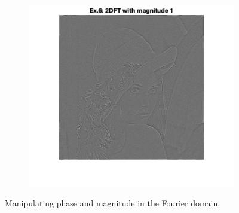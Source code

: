 \documentclass{article}
\begin{document}
\begin{enumerate}
\begin{figure}
\begin{subfigure}[b]{0.4\textwidth}
        \includegraphics[width=\textwidth]{images/lena_1_mag.png}
        \label{fig:fourier_1mag}
    \end{subfigure}
    \caption{Manipulating phase and magnitude in the Fourier domain.}
    \label{fig:fourier_mod}
    \end{figure}
\end{enumerate}
\end{document}
